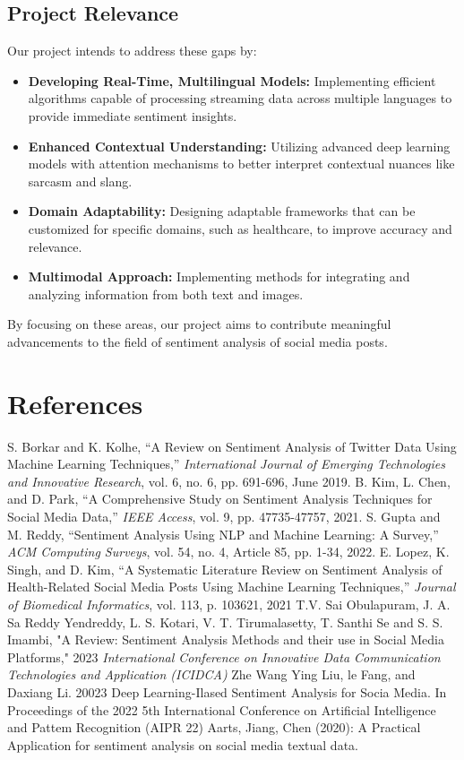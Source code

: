 \documentclass{IEEEtran}
\begin{document}
\subsection{Project Relevance}
Our project intends to address these gaps by:
\begin{itemize}
    \item \textbf{Developing Real-Time, Multilingual Models:} Implementing efficient algorithms capable of processing streaming data across multiple languages to provide immediate sentiment insights.
    \item \textbf{Enhanced Contextual Understanding:} Utilizing advanced deep learning models with attention mechanisms to better interpret contextual nuances like sarcasm and slang.
    \item \textbf{Domain Adaptability:} Designing adaptable frameworks that can be customized for specific domains, such as healthcare, to improve accuracy and relevance.
    \item \textbf{Multimodal Approach:} Implementing methods for integrating and analyzing information from both text and images.
\end{itemize}
By focusing on these areas, our project aims to contribute meaningful advancements to the field of sentiment analysis of social media posts.

\section{References}
\begin{thebibliography}{9}
     S. Borkar and K. Kolhe, “A Review on Sentiment Analysis of Twitter Data Using Machine Learning Techniques,” \textit{International Journal of Emerging Technologies and Innovative Research}, vol. 6, no. 6, pp. 691-696, June 2019.
     B. Kim, L. Chen, and D. Park, “A Comprehensive Study on Sentiment Analysis Techniques for Social Media Data,” \textit{IEEE Access}, vol. 9, pp. 47735-47757, 2021.
     S. Gupta and M. Reddy, “Sentiment Analysis Using NLP and Machine Learning: A Survey,” \textit{ACM Computing Surveys}, vol. 54, no. 4, Article 85, pp. 1-34, 2022.
     E. Lopez, K. Singh, and D. Kim, “A Systematic Literature Review on Sentiment Analysis of Health-Related Social Media Posts Using Machine Learning Techniques,” \textit{Journal of Biomedical Informatics}, vol. 113, p. 103621, 2021
     T.V. Sai Obulapuram, J. A. Sa Reddy Yendreddy, L. S. Kotari, V. T. Tirumalasetty, T. Santhi Se and S. S. Imambi, "A Review: Sentiment Analysis Methods and their use in Social Media Platforms," 2023 \textit{International Conference on Innovative Data Communication Technologies and Application (ICIDCA)}
     Zhe Wang Ying Liu, le Fang, and Daxiang Li. 20023 Deep Learning-Ilased Sentiment Analysis for Socia Media. In Proceedings of the 2022 5th International Conference on Artificial Intelligence and Pattem Recognition (AIPR 22)
     Aarts, Jiang, Chen (2020): A Practical Application for sentiment analysis on social media textual data.
\end{thebibliography}
\end{document}
